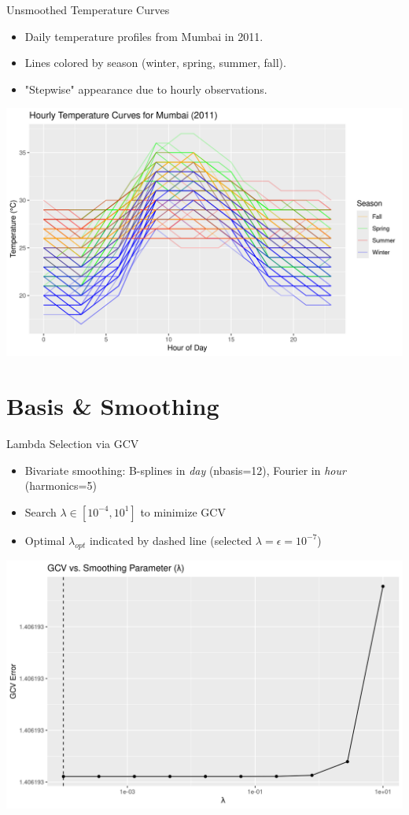 \documentclass[svgnames, 12pt]{beamer}
\begin{document}
\begin{frame}{Unsmoothed Temperature Curves}
	\begin{itemize}
		\item Daily temperature profiles from Mumbai in 2011.
		\item Lines colored by season (winter, spring, summer, fall).
		\item "Stepwise" appearance due to hourly observations.
	\end{itemize}
	\begin{center}
		\includegraphics[width=0.8\linewidth]{../notebooks/assets/unsmoothed_temp_curves_mumbai.png}
	\end{center}
\end{frame}

\section{Basis \& Smoothing}
\begin{frame}{Lambda Selection via GCV}
	\begin{itemize}
		\item Bivariate smoothing: B-splines in \emph{day} (nbasis=12), Fourier in \emph{hour} (harmonics=5)
		\item Search $\lambda\in[10^{-4},10^1]$ to minimize GCV
		\item Optimal $\lambda_{opt}$ indicated by dashed line (selected $\lambda=\epsilon=10^{-7}$)
	\end{itemize}
	\vfill
	\begin{center}
		\includegraphics[width=0.7\linewidth]{../notebooks/assets/gcv_vs_lambda.png}
	\end{center}
\end{frame}
\end{document}
